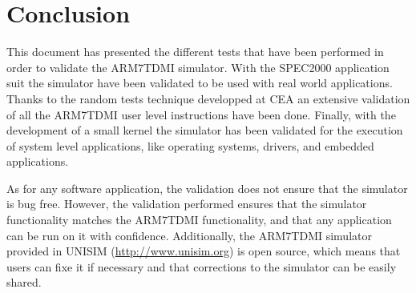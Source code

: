 \section{Conclusion}
\label{sec:conclusion}

This document has presented the different tests that have been performed in order to validate the ARM7TDMI simulator.
With the SPEC2000 application suit the simulator have been validated to be used with real world applications.
Thanks to the random tests technique developped at CEA an extensive validation of all the ARM7TDMI user level instructions have been done.
Finally, with the development of a small kernel the simulator has been validated for the execution of system level applications, like operating systems, drivers, and embedded applications.

As for any software application, the validation does not ensure that the simulator is bug free.
However, the validation performed ensures that the simulator functionality matches the ARM7TDMI functionality, and that any application can be run on it with confidence.
Additionally, the ARM7TDMI simulator provided in UNISIM (\url{http://www.unisim.org}) is open source, which means that users can fixe it if necessary and that corrections to the simulator can be easily shared.
